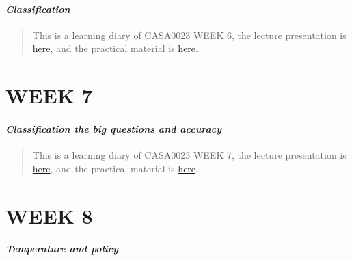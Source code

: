 \documentclass[
  letterpaper,
  DIV=11,
  numbers=noendperiod]{scrreprt}
\begin{document}
\hypertarget{classification}{%
\subsubsection*{\texorpdfstring{\textbf{\emph{Classification}}}{Classification}}\label{classification}}

\begin{quote}
This is a learning diary of CASA0023 WEEK 6, the lecture presentation is
\href{https://andrewmaclachlan.github.io/CASA0023-lecture-6/\#1}{here},
and the practical material is
\href{https://andrewmaclachlan.github.io/CASA0023/6_classification_I.html}{here}.
\end{quote}


\hypertarget{week-7}{%
\chapter*{\texorpdfstring{\textbf{WEEK 7}}{WEEK 7}}\label{week-7}}

\hypertarget{classification-the-big-questions-and-accuracy}{%
\subsubsection*{\texorpdfstring{\textbf{\emph{Classification the big
questions and
accuracy}}}{Classification the big questions and accuracy}}\label{classification-the-big-questions-and-accuracy}}

\begin{quote}
This is a learning diary of CASA0023 WEEK 7, the lecture presentation is
\href{https://andrewmaclachlan.github.io/CASA0023-lecture-7/\#1}{here},
and the practical material is
\href{https://andrewmaclachlan.github.io/CASA0023/7_classification_II.html}{here}.
\end{quote}


\hypertarget{week-8}{%
\chapter*{\texorpdfstring{\textbf{WEEK 8}}{WEEK 8}}\label{week-8}}

\hypertarget{temperature-and-policy}{%
\subsubsection*{\texorpdfstring{\textbf{\emph{Temperature and
policy}}}{Temperature and policy}}\label{temperature-and-policy}}
\end{document}
